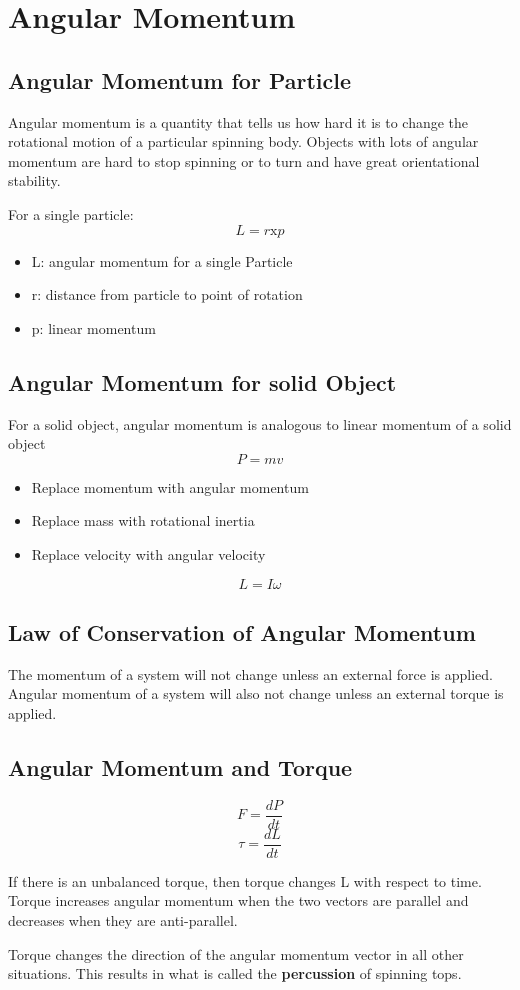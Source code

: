 \section{Angular Momentum}

\subsection{Angular Momentum for Particle}
Angular momentum is a quantity that tells us how hard it is to change the rotational motion of a particular spinning body. Objects with lots of angular momentum are hard to stop spinning or to turn and have great orientational stability. 

For a single particle:
\[L= r \text{x} p\]
\begin{itemize}
	\item L: angular momentum for a single Particle
	\item r: distance from particle to point of rotation
	\item p: linear momentum
\end{itemize}

\subsection{Angular Momentum for solid Object}
For a solid object, angular momentum is analogous to linear momentum of a solid object
\[P=mv\]
\begin{itemize}
	\item Replace momentum with angular momentum
	\item Replace mass with rotational inertia
	\item Replace velocity with angular velocity
\end{itemize}

\[L=I\omega\]

\subsection{Law of Conservation of Angular Momentum}
The momentum of a system will not change unless an external force is applied. Angular momentum of a system will also not change unless an external torque is applied.

\subsection{Angular Momentum and Torque}
\[F=\frac{dP}{dt}\]
\[\tau=\frac{dL}{dt}\]

If there is an unbalanced torque, then torque changes L with respect to time. Torque increases angular momentum when the two vectors are parallel and decreases when they are anti-parallel.

Torque changes the direction of the angular momentum vector in all other situations. This results in what is called the \textbf{percussion} of spinning tops.